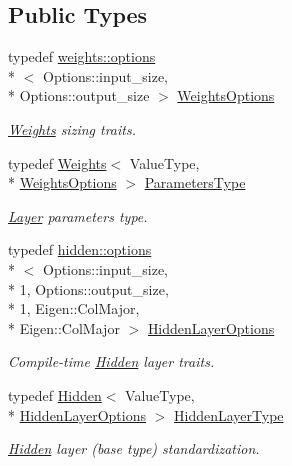\subsection*{Public Types}
\begin{DoxyCompactItemize}
\item 
typedef \hyperlink{structffnn_1_1layer_1_1fully__connected_1_1weights_1_1options}{weights\-::options}\\*
$<$ Options\-::input\-\_\-size, \\*
Options\-::output\-\_\-size $>$ \hyperlink{structffnn_1_1layer_1_1fully__connected_1_1extrinsics_a5f0107c20e71b4a7bd365fba7c671155}{Weights\-Options}
\begin{DoxyCompactList}\small\item\em \hyperlink{classffnn_1_1layer_1_1fully__connected_1_1_weights}{Weights} sizing traits. \end{DoxyCompactList}\item 
typedef \hyperlink{classffnn_1_1layer_1_1fully__connected_1_1_weights}{Weights}$<$ Value\-Type, \\*
\hyperlink{structffnn_1_1layer_1_1fully__connected_1_1extrinsics_a5f0107c20e71b4a7bd365fba7c671155}{Weights\-Options} $>$ \hyperlink{structffnn_1_1layer_1_1fully__connected_1_1extrinsics_a829f6f75fcd23a45225c85b7b0ac51f3}{Parameters\-Type}
\begin{DoxyCompactList}\small\item\em \hyperlink{classffnn_1_1layer_1_1_layer}{Layer} parameters type. \end{DoxyCompactList}\item 
typedef \hyperlink{structffnn_1_1layer_1_1hidden_1_1options}{hidden\-::options}\\*
$<$ Options\-::input\-\_\-size, \\*
1, Options\-::output\-\_\-size, \\*
1, Eigen\-::\-Col\-Major, \\*
Eigen\-::\-Col\-Major $>$ \hyperlink{structffnn_1_1layer_1_1fully__connected_1_1extrinsics_a051d178770500c0f9775ab63d8a8f9fb}{Hidden\-Layer\-Options}
\begin{DoxyCompactList}\small\item\em Compile-\/time \hyperlink{classffnn_1_1layer_1_1_hidden}{Hidden} layer traits. \end{DoxyCompactList}\item 
typedef \hyperlink{classffnn_1_1layer_1_1_hidden}{Hidden}$<$ Value\-Type, \\*
\hyperlink{structffnn_1_1layer_1_1fully__connected_1_1extrinsics_a051d178770500c0f9775ab63d8a8f9fb}{Hidden\-Layer\-Options} $>$ \hyperlink{structffnn_1_1layer_1_1fully__connected_1_1extrinsics_aafc02edf8e6c520eae8e44f92abb1925}{Hidden\-Layer\-Type}
\begin{DoxyCompactList}\small\item\em \hyperlink{classffnn_1_1layer_1_1_hidden}{Hidden} layer (base type) standardization. \end{DoxyCompactList}\end{DoxyCompactItemize}


